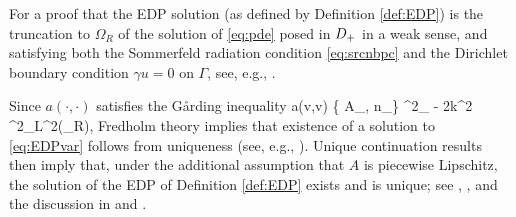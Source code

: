 For a proof that the EDP solution (as defined by Definition \ref{def:EDP}) is the truncation to $\Omega_R$ of the solution of \eqref{eq:pde} posed in $D_{+}$ in a weak sense, and satisfying both the Sommerfeld radiation condition \eqref{eq:srcnbpc} and the Dirichlet boundary condition $\gamma u =0$ on $\Gamma$, see, e.g., \cite[Lemma 3.3]{GrPeSp:19}.
\ere

Since $a(\cdot,\cdot)$ satisfies the G\aa rding inequality 
\beq\label{eq:Garding}
\Re a(v,v) \geq \min\big\{ A_{\min}, n_{\min}\big\} ^2_{\HokDR} - 2k^2 ^2_{L^2(\Omega_R)},
\eeq
Fredholm theory implies that existence of a solution to \eqref{eq:EDPvar} follows from uniqueness (see, e.g., \cite[Theorem 2.34]{Mc:00}).
Unique continuation results then imply that, under the additional assumption that $A$ is piecewise Lipschitz, the solution of the EDP of Definition \ref{def:EDP} exists and is unique; see \cite{GaLi:87}, \cite{BaCaTs:12}, and the discussion in \cite[\S1 and \S2.4]{GrPeSp:19} and \cite[\S]{GrSa:18}.
\ere



